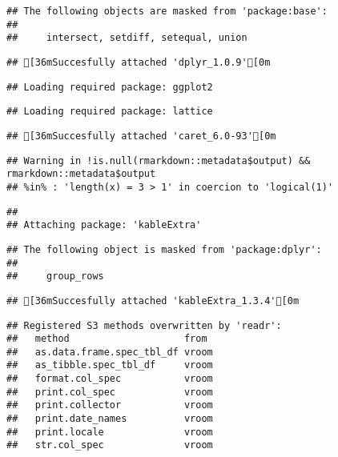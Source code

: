 \documentclass[
]{article}
\begin{document}
\begin{verbatim}
## The following objects are masked from 'package:base':
## 
##     intersect, setdiff, setequal, union
\end{verbatim}

\begin{verbatim}
## [36mSuccesfully attached 'dplyr_1.0.9'[0m
\end{verbatim}

\begin{verbatim}
## Loading required package: ggplot2
\end{verbatim}

\begin{verbatim}
## Loading required package: lattice
\end{verbatim}

\begin{verbatim}
## [36mSuccesfully attached 'caret_6.0-93'[0m
\end{verbatim}

\begin{verbatim}
## Warning in !is.null(rmarkdown::metadata$output) && rmarkdown::metadata$output
## %in% : 'length(x) = 3 > 1' in coercion to 'logical(1)'
\end{verbatim}

\begin{verbatim}
## 
## Attaching package: 'kableExtra'
\end{verbatim}

\begin{verbatim}
## The following object is masked from 'package:dplyr':
## 
##     group_rows
\end{verbatim}

\begin{verbatim}
## [36mSuccesfully attached 'kableExtra_1.3.4'[0m
\end{verbatim}

\begin{verbatim}
## Registered S3 methods overwritten by 'readr':
##   method                    from 
##   as.data.frame.spec_tbl_df vroom
##   as_tibble.spec_tbl_df     vroom
##   format.col_spec           vroom
##   print.col_spec            vroom
##   print.collector           vroom
##   print.date_names          vroom
##   print.locale              vroom
##   str.col_spec              vroom
\end{verbatim}
\end{document}
